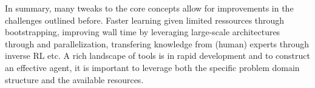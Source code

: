 In summary, many tweaks to the core concepts allow for improvements in the challenges outlined before. Faster learning given limited
ressources through bootstrapping, improving wall time by leveraging large-scale architectures through and
parallelization, transfering knowledge from (human) experts through inverse \ac {RL} etc. A rich landscape of tools is
in rapid development and to construct an effective agent, it is important to leverage both the specific problem domain
structure and the available resources. 
